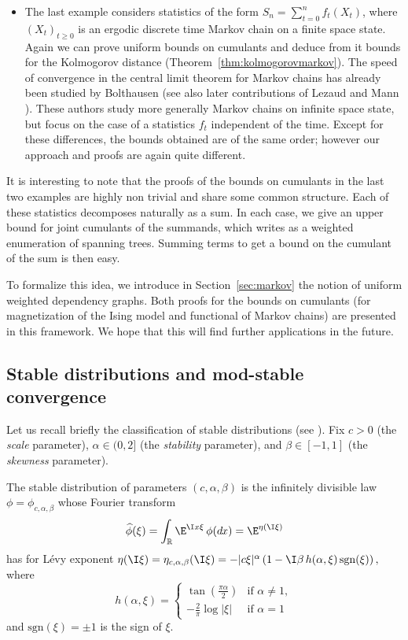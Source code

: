 \documentclass[envcountsame]{svmult}
\newcommand{\R}{\mathbb{R}}
\newcommand{\DD}[1]{\,d\hspace*{-0.3mm}{#1}}
\begin{document}
\begin{itemize}
\item The last example considers statistics of the form $S_n=\sum_{t=0}^n f_t(X_t)$,
  where $(X_t)_{t \ge 0}$ is an ergodic discrete time Markov chain on a finite space state.
  Again we can prove uniform bounds on cumulants and deduce from it bounds for the Kolmogorov distance
  (Theorem~\ref{thm:kolmogorovmarkov}).
  The speed of convergence in the central limit theorem for Markov chains
  has already been studied by Bolthausen \cite{Bol80}
  (see also later contributions of Lezaud \cite{Lez96} and Mann \cite{Mann96}).
  These authors study more generally Markov chains on infinite space state,
  but focus on the case of a statistics $f_t$ independent of the time.
  Except for these differences, the bounds obtained are of the same order; however our approach and proofs are again quite different.
\end{itemize}
It is interesting to note that the proofs of the bounds on cumulants in the last two examples
are highly non trivial and share some common structure.
Each of these statistics decomposes naturally as a sum.
In each case, we give an upper bound for joint cumulants of the summands,
which writes as a weighted enumeration of spanning trees.
Summing terms to get a bound on the cumulant of the sum is then easy.\medskip

To formalize this idea, we introduce in Section~\ref{sec:markov} the notion
of uniform weighted dependency graphs.
Both proofs for the bounds on cumulants (for magnetization of the Ising model
and functional of Markov chains) are presented in this framework.
We hope that this will find further applications in the future.



\subsection{Stable distributions and mod-stable convergence}
\label{Sect:Background_Stable}
Let us recall briefly the classification of stable distributions (see \cite[Chapter 3]{Sato99}). Fix $c>0$ (the \emph{scale} parameter), $\alpha \in (0,2]$ (the \emph{stability} parameter), and $\beta \in [-1,1]$ (the \emph{skewness} parameter). 

\begin{definition}
The stable distribution of parameters $(c,\alpha,\beta)$ is the infinitely divisible law 
\hbox{$\phi=\phi_{c,\alpha,\beta}$} whose Fourier transform
$$\widehat{\phi}(\xi)=\int_{\R}\E^{\I x\xi} \,\phi(\!\DD{x}) = \E^{\eta(\I\xi)}$$
has for L\'evy exponent $\eta(\I\xi)=\eta_{c,\alpha,\beta}(\I\xi)= -|c\xi|^\alpha \left(1-\I \beta \,h(\alpha,\xi)\,\mathrm{sgn}(\xi)\right),$
where
$$h(\alpha,\xi) =\begin{cases}
\tan\left( \frac{\pi \alpha}{2}\right)& \text{if }\alpha \neq 1,\\
-\frac{2}{\pi} \log |\xi|& \text{if }\alpha = 1
\end{cases}$$
and $\mathrm{sgn}(\xi) = \pm 1$ is the sign of $\xi$.
\end{definition}
\end{document}

